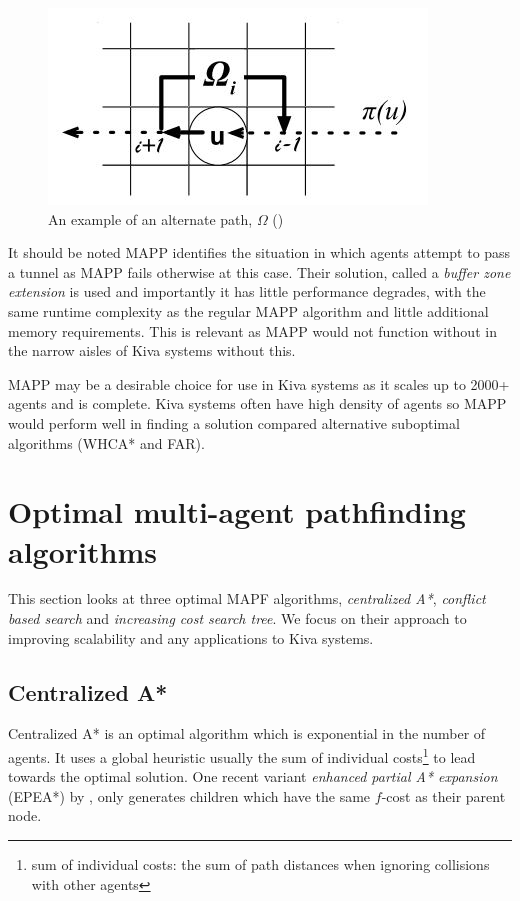 \documentclass[a4paper,11pt]{article}
\begin{document}
\begin{figure}[H]
	\centering
	\includegraphics[width=0.4\linewidth]{graphics/omegapath}
	\caption{An example of an alternate path, $\Omega$ (\cite{wang2011mapp})}
	\label{fig:omegapath}
\end{figure}

It should be noted MAPP identifies the situation in which agents attempt to pass a tunnel as MAPP fails otherwise at this case. Their solution, called a \textit{buffer zone extension} is used and importantly it has little performance degrades, with the same runtime complexity as the regular MAPP algorithm and little additional memory requirements. This is relevant as MAPP would not function without in the narrow aisles of Kiva systems without this.

MAPP may be a desirable choice for use in Kiva systems as it scales up to 2000+ agents and is complete. Kiva systems often have high density of agents so MAPP would perform well in finding a solution compared alternative suboptimal algorithms (WHCA* and FAR).

\section{Optimal multi-agent pathfinding algorithms} \label{sec:optimal}
This section looks at three optimal MAPF algorithms, \textit{centralized A*}, \textit{conflict based search} and \textit{increasing cost search tree}. We focus on their approach to improving scalability and any applications to Kiva systems.

\subsection{Centralized A*}
Centralized A* is an optimal algorithm which is exponential in the number of agents. It uses a global heuristic usually the sum of individual costs\footnote{sum of individual costs: the sum of path distances when ignoring collisions with other agents} to lead towards the optimal solution. One recent variant \textit{enhanced partial A* expansion} (EPEA*) by \cite{goldenberg2014enhanced}, only generates children which have the same $f$-cost as their parent node.
\end{document}
